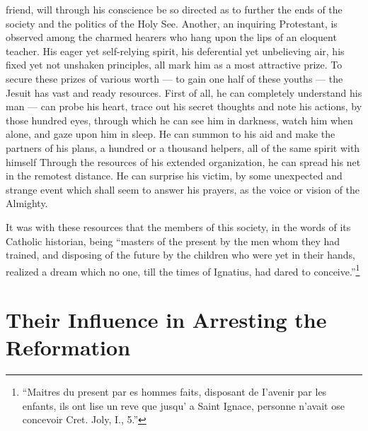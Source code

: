 \documentclass[]{book}
\let\rmarkdownfootnote\footnote%
\def\footnote{\protect\rmarkdownfootnote}
\begin{document}
friend, will through his conscience be so directed as to further the ends of the society and the politics of the Holy See. Another, an inquiring Protestant, is observed among the charmed hearers who hang upon the lips of an eloquent teacher. His eager yet self-relying spirit, his deferential yet unbelieving air, his fixed yet not unshaken principles, all mark him as a most attractive prize. To secure these prizes of various worth --- to gain one half of these youths --- the Jesuit has vast and ready resources. First of all, he can completely understand his man --- can probe his heart, trace out his secret thoughts and note his actions, by those hundred eyes, through which he can see him in darkness, watch him when alone, and gaze upon him in sleep. He can summon to his aid and make the partners of his plans, a hundred or a thousand helpers, all of the same spirit with himself Through the resources of his extended organization, he can spread his net in the remotest distance. He can surprise his victim, by some unexpected and strange event which shall seem to answer his prayers, as the voice or vision of the Almighty.

It was with these resources that the members of this society, in the words of its Catholic historian, being ``masters of the present by the men whom they had trained, and disposing of the future by the children who were yet in their hands, realized a dream which no one, till the times of Ignatius, had dared to conceive.''\footnote{``Maitres du present par es hommes faits, disposant de I'avenir par les enfants, ils ont lise un reve que jusqu' a Saint Ignace, personne n'avait ose concevoir Cret. Joly, I., 5.''}

\hypertarget{their-influence-in-arresting-the-reformation}{%
\chapter{Their Influence in Arresting the Reformation}\label{their-influence-in-arresting-the-reformation}}
\end{document}
